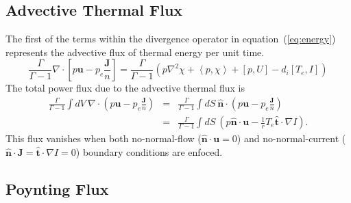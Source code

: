 \documentclass[draft]{book}
\renewcommand{\vec}[1]{\ensuremath{\mathbf{#1}}}
\renewcommand{\u}{\vec{u}}
\renewcommand{\j}{\vec{J}}
\newcommand{\grad}[1]{\nabla #1}
\renewcommand{\div}[1]{\nabla \cdot #1}
\newcommand{\lp}[1]{\nabla^2 #1}
\newcommand{\pb}[2]{\left[#1,#2\right]}
\newcommand{\ip}[2]{\left\langle  #1,#2\right\rangle}
\newcommand{\uvec}[1]{\ensuremath{\vec{\hat{#1}}}}
\begin{document}
\subsection{Advective Thermal Flux}

The first of the terms within the divergence operator in
equation~(\ref{eq:energy}) represents the advective flux of thermal
energy per unit time.
\begin{equation}
  \frac{\Gamma}{\Gamma - 1} \div \left[ p \u - p_e \frac{\j}{n}
  \right] = \frac{\Gamma}{\Gamma - 1} \left( 
  p \lp\chi + \ip{p}{\chi} + \pb{p}{U} - d_i \pb{T_e}{I} \right)
\end{equation}
The total power flux due to the advective thermal flux is
\begin{eqnarray*}
  \frac{\Gamma}{\Gamma - 1} \int dV\ \div 
  \left( p \u - p_e \frac{\j}{n} \right) 
  & = & \frac{\Gamma}{\Gamma - 1} \int dS\ \uvec{n} \cdot
  \left( p \u - p_e \frac{\j}{n} \right) \\ 
  & = & \frac{\Gamma}{\Gamma - 1} \int dS\ 
  \left( p \uvec{n} \cdot \u - \frac{1}{r} T_e \uvec{t}\cdot \grad I \right).
\end{eqnarray*}
This flux vanishes when both no-normal-flow ($\uvec{n} \cdot \u =
0$) and no-normal-current ($\uvec{n} \cdot \j = \uvec{t} \cdot \grad I
= 0$) boundary conditions are enfoced.

\subsection{Poynting Flux}
\end{document}
